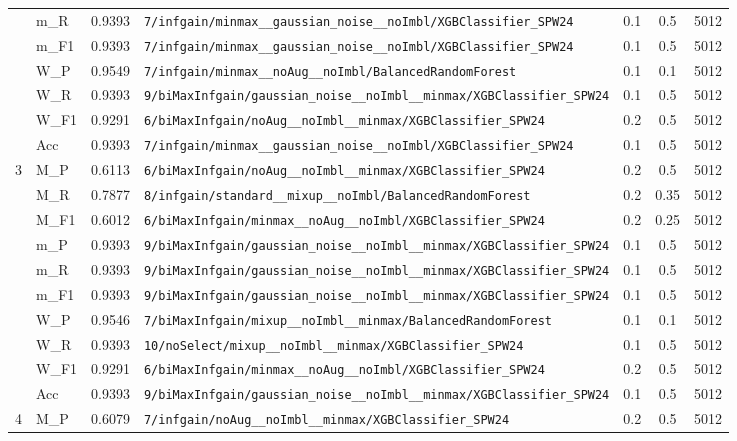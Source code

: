 \begin{table}[htbp]
\begin{tabular}{|c|l|c|>{\ttfamily\footnotesize}p{7.2cm}|c|c|c|}
 & m\_R & 0.9393 & \texttt{7/infgain/minmax\_\_gaussian\_noise\_\_noImbl/XGBClassifier\_SPW24} & 0.1 & 0.5  & 5012 \\ 
 & m\_F1 & 0.9393 & \texttt{7/infgain/minmax\_\_gaussian\_noise\_\_noImbl/XGBClassifier\_SPW24} & 0.1 & 0.5  & 5012 \\ 
 & W\_P & 0.9549 & \texttt{7/infgain/minmax\_\_noAug\_\_noImbl/BalancedRandomForest} & 0.1 & 0.1  & 5012 \\ 
 & W\_R & 0.9393 & \texttt{9/biMaxInfgain/gaussian\_noise\_\_noImbl\_\_minmax/XGBClassifier\_SPW24} & 0.1 & 0.5  & 5012 \\ 
 & W\_F1 & 0.9291 & \texttt{6/biMaxInfgain/noAug\_\_noImbl\_\_minmax/XGBClassifier\_SPW24} & 0.2 & 0.5  & 5012 \\ 
 & Acc & 0.9393 & \texttt{7/infgain/minmax\_\_gaussian\_noise\_\_noImbl/XGBClassifier\_SPW24} & 0.1 & 0.5  & 5012 \\ 
\hline
\multirow{10}{*}{3} & M\_P & 0.6113 & \texttt{6/biMaxInfgain/noAug\_\_noImbl\_\_minmax/XGBClassifier\_SPW24} & 0.2 & 0.5  & 5012 \\ 
 & M\_R & 0.7877 & \texttt{8/infgain/standard\_\_mixup\_\_noImbl/BalancedRandomForest} & 0.2 & 0.35  & 5012 \\ 
 & M\_F1 & 0.6012 & \texttt{6/biMaxInfgain/minmax\_\_noAug\_\_noImbl/XGBClassifier\_SPW24} & 0.2 & 0.25  & 5012 \\ 
 & m\_P & 0.9393 & \texttt{9/biMaxInfgain/gaussian\_noise\_\_noImbl\_\_minmax/XGBClassifier\_SPW24} & 0.1 & 0.5  & 5012 \\ 
 & m\_R & 0.9393 & \texttt{9/biMaxInfgain/gaussian\_noise\_\_noImbl\_\_minmax/XGBClassifier\_SPW24} & 0.1 & 0.5  & 5012 \\ 
 & m\_F1 & 0.9393 & \texttt{9/biMaxInfgain/gaussian\_noise\_\_noImbl\_\_minmax/XGBClassifier\_SPW24} & 0.1 & 0.5  & 5012 \\ 
 & W\_P & 0.9546 & \texttt{7/biMaxInfgain/mixup\_\_noImbl\_\_minmax/BalancedRandomForest} & 0.1 & 0.1  & 5012 \\ 
 & W\_R & 0.9393 & \texttt{10/noSelect/mixup\_\_noImbl\_\_minmax/XGBClassifier\_SPW24} & 0.1 & 0.5  & 5012 \\ 
 & W\_F1 & 0.9291 & \texttt{6/biMaxInfgain/minmax\_\_noAug\_\_noImbl/XGBClassifier\_SPW24} & 0.2 & 0.5  & 5012 \\ 
 & Acc & 0.9393 & \texttt{9/biMaxInfgain/gaussian\_noise\_\_noImbl\_\_minmax/XGBClassifier\_SPW24} & 0.1 & 0.5  & 5012 \\ 
\hline
\multirow{10}{*}{4} & M\_P & 0.6079 & \texttt{7/infgain/noAug\_\_noImbl\_\_minmax/XGBClassifier\_SPW24} & 0.2 & 0.5  & 5012 \\ 

\end{tabular}
\end{table}

